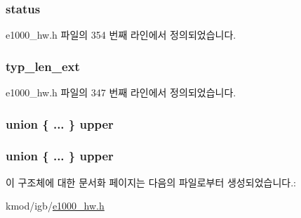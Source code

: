 \subsubsection[{\texorpdfstring{status}{status}}]{ status}\hypertarget{structe1000__data__desc_aa648386576736be0dd25c95b6edd37d2}{}\label{structe1000__data__desc_aa648386576736be0dd25c95b6edd37d2}


e1000\+\_\+hw.\+h 파일의 354 번째 라인에서 정의되었습니다.

\subsubsection[{\texorpdfstring{typ\+\_\+len\+\_\+ext}{typ_len_ext}}]{ typ\+\_\+len\+\_\+ext}\hypertarget{structe1000__data__desc_a77e9224dae91b7c13986d4e82a58b599}{}\label{structe1000__data__desc_a77e9224dae91b7c13986d4e82a58b599}


e1000\+\_\+hw.\+h 파일의 347 번째 라인에서 정의되었습니다.

\subsubsection[{\texorpdfstring{upper}{upper}}]{\setlength{\rightskip}{0pt plus 5cm}union \{ ... \}   upper}\hypertarget{structe1000__data__desc_a5ac00a230190a1ea0fea9984f38b6c8e}{}\label{structe1000__data__desc_a5ac00a230190a1ea0fea9984f38b6c8e}
\subsubsection[{\texorpdfstring{upper}{upper}}]{\setlength{\rightskip}{0pt plus 5cm}union \{ ... \}   upper}\hypertarget{structe1000__data__desc_a353d2fd93e18cd66536e2227cb1ef0c5}{}\label{structe1000__data__desc_a353d2fd93e18cd66536e2227cb1ef0c5}


이 구조체에 대한 문서화 페이지는 다음의 파일로부터 생성되었습니다.\+:\begin{DoxyCompactItemize}
\item 
kmod/igb/\hyperlink{kmod_2igb_2e1000__hw_8h}{e1000\+\_\+hw.\+h}\end{DoxyCompactItemize}
